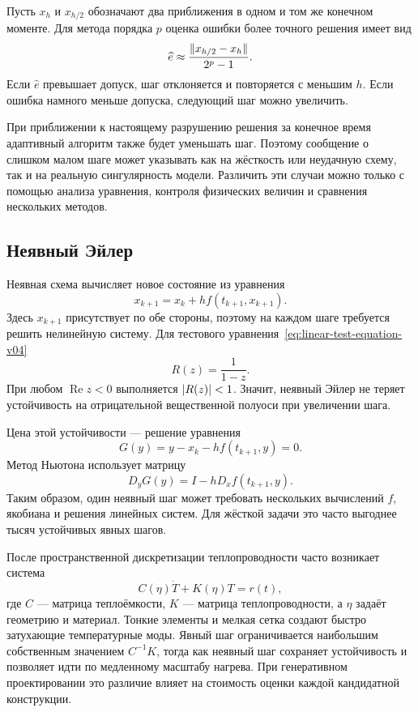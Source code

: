 Пусть $x_h$ и $x_{h/2}$ обозначают два приближения в одном и том же конечном моменте. Для метода порядка $p$ оценка ошибки более точного решения имеет вид
\begin{equation}
\label{eq:step-doubling-error-v04}
\widehat e
\approx
\frac{\lVert x_{h/2}-x_h\rVert}{2^p-1}.
\end{equation}
Если $\widehat e$ превышает допуск, шаг отклоняется и повторяется с меньшим $h$. Если ошибка намного меньше допуска, следующий шаг можно увеличить.

\begin{caution}
При приближении к настоящему разрушению решения за конечное время адаптивный алгоритм также будет уменьшать шаг. Поэтому сообщение о слишком малом шаге может указывать как на жёсткость или неудачную схему, так и на реальную сингулярность модели. Различить эти случаи можно только с помощью анализа уравнения, контроля физических величин и сравнения нескольких методов.
\end{caution}

\subsection{Неявный Эйлер}

Неявная схема вычисляет новое состояние из уравнения
\begin{equation}
\label{eq:implicit-euler-v04}
x_{k+1}
=
x_k+h f(t_{k+1},x_{k+1}).
\end{equation}
Здесь $x_{k+1}$ присутствует по обе стороны, поэтому на каждом шаге требуется решить нелинейную систему. Для тестового уравнения~\eqref{eq:linear-test-equation-v04}
\[
R(z)=\frac{1}{1-z}.
\]
При любом $\operatorname{Re}z<0$ выполняется $\lvert R(z)\rvert<1$. Значит, неявный Эйлер не теряет устойчивость на отрицательной вещественной полуоси при увеличении шага.

Цена этой устойчивости --- решение уравнения
\[
G(y)=y-x_k-hf(t_{k+1},y)=0.
\]
Метод Ньютона использует матрицу
\begin{equation}
\label{eq:implicit-newton-jacobian-v04}
D_yG(y)=I-hD_xf(t_{k+1},y).
\end{equation}
Таким образом, один неявный шаг может требовать нескольких вычислений $f$, якобиана и решения линейных систем. Для жёсткой задачи это часто выгоднее тысяч устойчивых явных шагов.

\begin{application}
После пространственной дискретизации теплопроводности часто возникает система
\[
C(\eta)\dot T+K(\eta)T=r(t),
\]
где $C$ --- матрица теплоёмкости, $K$ --- матрица теплопроводности, а $\eta$ задаёт геометрию и материал. Тонкие элементы и мелкая сетка создают быстро затухающие температурные моды. Явный шаг ограничивается наибольшим собственным значением $C^{-1}K$, тогда как неявный шаг сохраняет устойчивость и позволяет идти по медленному масштабу нагрева. При генеративном проектировании это различие влияет на стоимость оценки каждой кандидатной конструкции.
\end{application}

